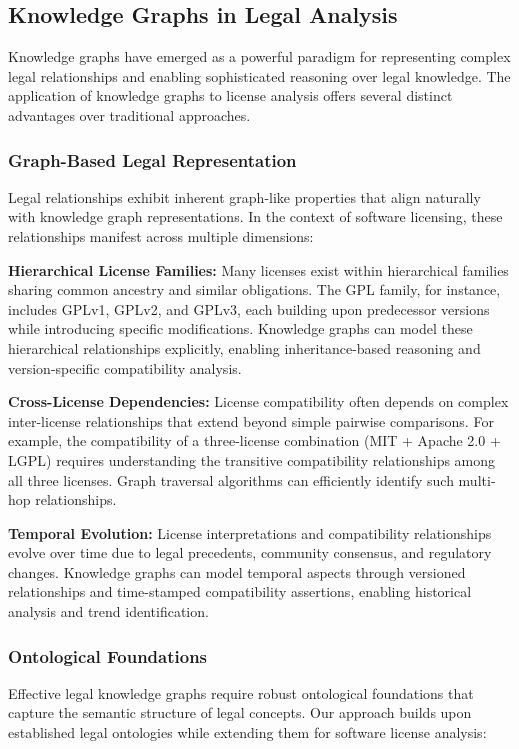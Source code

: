 \documentclass[9pt,twocolumn]{article}
\begin{document}
\subsection{Knowledge Graphs in Legal Analysis}
Knowledge graphs have emerged as a powerful paradigm for representing complex legal relationships and enabling sophisticated reasoning over legal knowledge. The application of knowledge graphs to license analysis offers several distinct advantages over traditional approaches.

\subsubsection{Graph-Based Legal Representation}
Legal relationships exhibit inherent graph-like properties that align naturally with knowledge graph representations. In the context of software licensing, these relationships manifest across multiple dimensions:

\textbf{Hierarchical License Families:} Many licenses exist within hierarchical families sharing common ancestry and similar obligations. The GPL family, for instance, includes GPLv1, GPLv2, and GPLv3, each building upon predecessor versions while introducing specific modifications. Knowledge graphs can model these hierarchical relationships explicitly, enabling inheritance-based reasoning and version-specific compatibility analysis.

\textbf{Cross-License Dependencies:} License compatibility often depends on complex inter-license relationships that extend beyond simple pairwise comparisons. For example, the compatibility of a three-license combination (MIT + Apache 2.0 + LGPL) requires understanding the transitive compatibility relationships among all three licenses. Graph traversal algorithms can efficiently identify such multi-hop relationships.

\textbf{Temporal Evolution:} License interpretations and compatibility relationships evolve over time due to legal precedents, community consensus, and regulatory changes. Knowledge graphs can model temporal aspects through versioned relationships and time-stamped compatibility assertions, enabling historical analysis and trend identification.

\subsubsection{Ontological Foundations}
Effective legal knowledge graphs require robust ontological foundations that capture the semantic structure of legal concepts. Our approach builds upon established legal ontologies while extending them for software license analysis:
\end{document}
